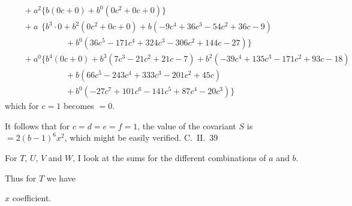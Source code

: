 \documentclass[11pt,a4paper]{book}
\begin{document}
\begin{center}
\begin{align*}
  &\quad + a^2\{b(0c + 0) + b^0(0c^2 + 0c + 0)\}\\
  &\quad + a\phantom{^2}\{b^3\cdot 0 + b^2(0c^2 + 0c + 0) + b(-9c^4 + 36c^3 - 54c^2 + 36c - 9)\\
  &\qquad\qquad\qquad + b^0(36c^5 - 171c^4 + 324c^3 - 306c^2 + 144c - 27)\}\\
  &\quad + a^0\{b^4(0c + 0) + b^3(7c^3 - 21c^2 + 21c - 7) + b^2(-39c^4 + 135c^3 - 171c^2 + 93c - 18)\\
  &\qquad\qquad\qquad + b(66c^5 - 243c^4 + 333c^3 - 201c^2 + 45c)\\
  &\qquad\qquad\qquad + b^0(-27c^7 + 101c^6 - 141c^5 + 87c^4 - 20c^3)\}
\end{align*}
which for $c=1$ becomes $=0$.

It follows that for $c=d=e=f=1$, the value of the covariant $S$ is $=2(b-1)^6x^2$,
which might be easily verified. \hfill C.~II.~39

\clearpage
For $T$, $U$, $V$ and $W$, I look at the sums for the different combinations of $a$ and $b$.

Thus for $T$ we have

\begin{center}
\small
\begin{minipage}[t]{0.45\textwidth}
\centering $x$ coefficient.


\end{minipage}
\end{center}
\end{center}
\end{document}
